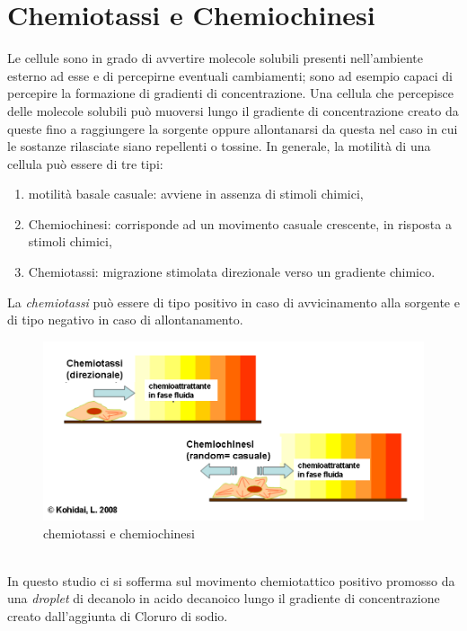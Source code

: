 \section{Chemiotassi e Chemiochinesi}
\label{sec:456}
Le cellule sono in grado di avvertire molecole solubili presenti nell'ambiente esterno ad esse e di percepirne eventuali cambiamenti; sono ad esempio capaci di percepire la formazione di gradienti di concentrazione. 
Una cellula che percepisce delle molecole solubili può muoversi lungo il gradiente di concentrazione creato da queste fino a raggiungere la sorgente oppure allontanarsi da questa nel caso in cui le sostanze rilasciate siano repellenti o tossine.
In generale, la motilità di una cellula può essere di tre tipi:
\begin{enumerate}
\item motilità basale casuale: avviene in assenza di stimoli chimici,
\item Chemiochinesi: corrisponde ad un movimento casuale crescente, in risposta a stimoli chimici,
\item Chemiotassi: migrazione stimolata direzionale verso un gradiente chimico.
\end{enumerate}
La \emph{chemiotassi} può essere di tipo positivo in caso di avvicinamento alla sorgente e di tipo negativo in caso di allontanamento.
	\begin{figure}[h]
	  \includegraphics[scale=0.50]{immagini/chemochin.png}
		\centering	
	 \caption{chemiotassi e chemiochinesi}
	\end{figure}
\pagebreak
\\In questo studio ci si sofferma sul movimento chemiotattico positivo promosso da una \emph{droplet} di decanolo in acido decanoico lungo il gradiente di concentrazione creato dall'aggiunta di Cloruro di sodio.

